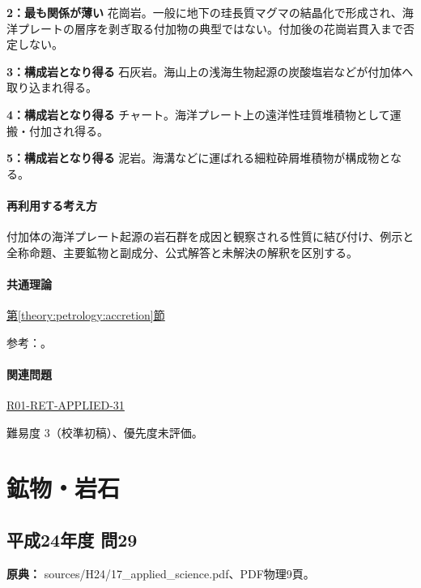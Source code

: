 \noindent\textbf{2：最も関係が薄い} 花崗岩。一般に地下の珪長質マグマの結晶化で形成され、海洋プレートの層序を剥ぎ取る付加物の典型ではない。付加後の花崗岩貫入まで否定しない。\par

\noindent\textbf{3：構成岩となり得る} 石灰岩。海山上の浅海生物起源の炭酸塩岩などが付加体へ取り込まれ得る。\par

\noindent\textbf{4：構成岩となり得る} チャート。海洋プレート上の遠洋性珪質堆積物として運搬・付加され得る。\par

\noindent\textbf{5：構成岩となり得る} 泥岩。海溝などに運ばれる細粒砕屑堆積物が構成物となる。\par

\paragraph{再利用する考え方} 付加体の海洋プレート起源の岩石群を成因と観察される性質に結び付け、例示と全称命題、主要鉱物と副成分、公式解答と未解決の解釈を区別する。

\paragraph{共通理論} \hyperref[theory:petrology:accretion]{第\ref*{theory:petrology:accretion}節}

\par 参考：\cite{aist_accretion2026,gsj_saganoseki1993}。

\paragraph{関連問題} \hyperref[q:r01-ret-applied-31]{R01-RET-APPLIED-31}

\par 難易度 3（校準初稿）、優先度未評価。

\section{鉱物・岩石}

\subsection{平成24年度 問29}
\label{q:h24-reg-applied-29}

\noindent\textbf{原典：} sources/H24/17\_applied\_science.pdf、PDF物理9頁。


